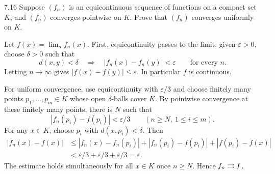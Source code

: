 \documentclass[11pt, oneside]{article}
\begin{document}
\begin{exercise}{7.16}
Suppose $(f_n)$ is an equicontinuous sequence of functions on a compact set $K$, and $(f_n)$ converges pointwise on $K$. Prove that $(f_n)$ converges uniformly on $K$.
\end{exercise}
\begin{solution}
Let $f(x)=\lim_nf_n(x)$. First, equicontinuity passes to the limit: given $\varepsilon>0$, choose $\delta>0$ such that
\[
 d(x, y)<\delta\quad\Longrightarrow\quad
 |f_n(x)-f_n(y)|<\varepsilon\qquad\text{for every }n.
\]
Letting $n\to\infty$ gives $|f(x)-f(y)|\le\varepsilon$. In particular $f$ is continuous.

For uniform convergence, use equicontinuity with $\varepsilon/3$ and choose finitely many points $p_1, \ldots, p_m\in K$ whose open $\delta$-balls cover $K$. By pointwise convergence at these finitely many points, there is $N$ such that
\[
 |f_n(p_i)-f(p_i)|<\varepsilon/3\qquad(n\ge N, \ 1\le i\le m).
\]
For any $x\in K$, choose $p_i$ with $d(x, p_i)<\delta$. Then
\[
 \begin{aligned}
 |f_n(x)-f(x)|
 &\le|f_n(x)-f_n(p_i)|+|f_n(p_i)-f(p_i)|+|f(p_i)-f(x)|\\
 &<\varepsilon/3+\varepsilon/3+\varepsilon/3=\varepsilon.
 \end{aligned}
\]
The estimate holds simultaneously for all $x\in K$ once $n\ge N$. Hence $f_n\rightrightarrows f$.
\end{solution}
\end{document}
